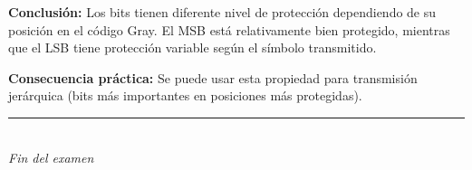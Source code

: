 \documentclass[11pt,a4paper]{article}
\begin{document}
\textbf{Conclusi\'on:} Los bits tienen diferente nivel de protecci\'on dependiendo de su posici\'on en el c\'odigo Gray. El MSB est\'a relativamente bien protegido, mientras que el LSB tiene protecci\'on variable seg\'un el s\'imbolo transmitido.

\textbf{Consecuencia pr\'actica:} Se puede usar esta propiedad para transmisi\'on jer\'arquica (bits m\'as importantes en posiciones m\'as protegidas).



\vspace{1cm}
\begin{center}
\rule{0.8\linewidth}{0.4pt}\\
\textit{Fin del examen}
\end{center}
\end{document}
